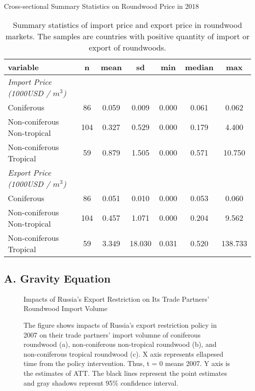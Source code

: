\documentclass[a4paper,12pt]{article}
\begin{document}
\begin{table}[htbp]
    \caption{Cross-sectional Summary Statistics on Roundwood Price in 2018}
    \centering
    \begin{tabular}{lcccccc}
        \tabularnewline \midrule \midrule
        variable & n & mean & sd & min & median & max\\
        \midrule
        \emph{Import Price (1000USD / $m^3$)}\\
        Coniferous & 86 & 0.059 & 0.009 & 0.000 & 0.061 & 0.062\\
        Non-coniferous Non-tropical & 104 & 0.327 & 0.529 & 0.000 & 0.179 & 4.400\\
        Non-coniferous Tropical & 59 & 0.879 & 1.505 & 0.000 & 0.571 & 10.750\\
        \midrule
        \emph{Export Price (1000USD / $m^3$)}\\
        Coniferous & 86 & 0.051 & 0.010 & 0.000 & 0.053 & 0.060\\
        Non-coniferous Non-tropical & 104 & 0.457 & 1.071 & 0.000 & 0.204 & 9.562\\
        Non-coniferous Tropical & 59 & 3.349 & 18.030 & 0.031 & 0.520 & 138.733\\
\midrule \midrule
        \end{tabular}
        \caption*{\small{Summary statistics of import price and export price in roundwood markets. The samples are countries with positive quantity of import or export of roundwoods.}}
        \label{tab:summary_stat_price}
 \end{table}


\subsection*{A. Gravity Equation}
\begin{figure}[htbp] 
    \centering
    \caption{Impacts of Russia's Export Restriction on Its Trade Partners' Roundwood Import Volume}
    \caption*{\small{The figure shows impacts of Russia's export restriction policy in 2007 on their trade partners' import volumne of coniferous roundwood (a), non-coniferous non-tropical roundwood (b), and non-coniferous tropical roundwood (c). X axis represents ellapesed time from the policy intervention. Thus, t = 0 means 2007. Y axis is the estimates of ATT. The black lines represent the point estimates and gray shadows represnt 95\% confidence interval.}}
    \label{fig:competitor_prod_Myanmar}
\end{figure}
\end{document}
